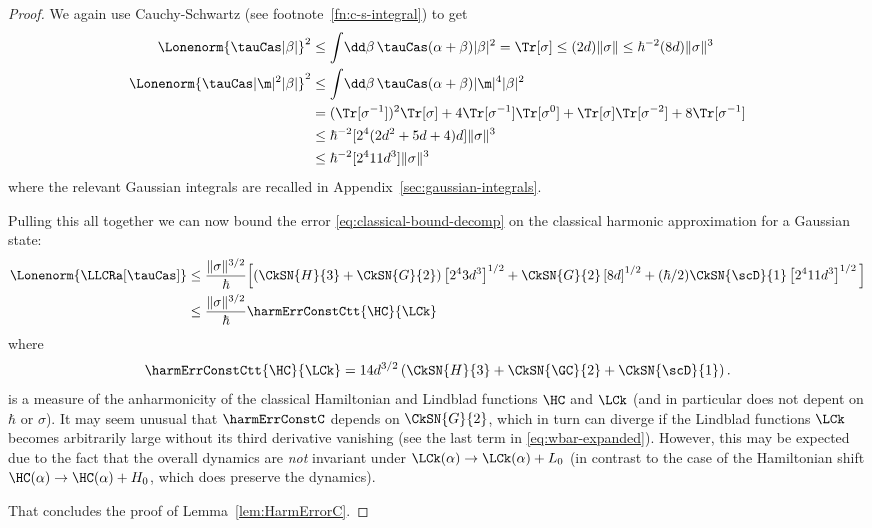 \documentclass{article}
\numberwithin{equation}{section}
\begin{document}
\begin{proof}
We again use Cauchy-Schwartz (see footnote~\ref{fn:c-s-integral}) to get
\begin{align}\begin{split}
		\label{eq:gaussian-int-m2-b1}
		\Lonenorm{\tauCas |\beta| }^2
		&\le \int \!\dd \beta\, \tauCas(\alpha+\beta)  |\beta|^2
		=  \Tr[\sigma ]
		\le  (2d) \|\sigma\| \le \hbar^{-2}(8d) \|\sigma\|^3
		\\
		\Lonenorm{\tauCas |\m|^2 |\beta| }^2
		&\le \int \!\dd \beta\, \tauCas(\alpha+\beta)  |\m|^4 |\beta|^2\\
		&=  (\Tr [\sigma^{-1}])^2\Tr[\sigma]+4\Tr[\sigma^{-1}]\Tr[\sigma^0]+ \Tr[\sigma] \Tr[\sigma^{-2}] + 8\Tr[\sigma^{-1}]\\
		&\le  \hbar^{-2} [2^4(2d^2+5d+4)d]\|\sigma\|^3\\
            &\le  \hbar^{-2} [2^4 11 d^3]\|\sigma\|^3
\end{split}\end{align}
where the relevant Gaussian integrals are recalled in Appendix~\ref{sec:gaussian-integrals}.


Pulling this all together we can now bound the error \eqref{eq:classical-bound-decomp} on the classical harmonic approximation for a Gaussian state:
\begin{align}\begin{split}\label{classical-error-bound}
		\Lonenorm{\LLCRa [\tauCas]}
            &\le \frac{\|\sigma\|^{3/2}}{\hbar}\Big[ (\CkSN{H}{3} + \CkSN{G}{2})  \left[2^4 3 d^3\right]^{1/2} + \CkSN{G}{2}  \left[8d\right]^{1/2} + (\hbar/2)\CkSN{\scD}{1}  \left[2^4 11 d^3\right]^{1/2} \Big] \\
		&\le \frac{\|\sigma\|^{3/2}}{\hbar} \harmErrConstCtt{\HC}{\LCk}
\end{split}\end{align}
where 
\begin{align} \label{eq:harmErrConstC-repeat}
	\harmErrConstCtt{\HC}{\LCk} = 14 d^{3/2}\left(\CkSN{H}{3} +  
     \CkSN{\GC}{2}  
     + 
     \CkSN{\scD}{1} 
     \right).
\end{align}
is a measure of the anharmonicity of the classical Hamiltonian and Lindblad functions $\HC$ and $\LCk$ (and in particular does not depent on $\hbar$ or $\sigma$).
It may seem unusual that $\harmErrConstC$ depends on $\CkSN{G}{2}$, which in turn can diverge if the Lindblad functions $\LCk$ becomes arbitrarily large without its third derivative vanishing (see the last term in \eqref{eq:wbar-expanded}). However, this may be expected due to the fact that the overall dynamics are \emph{not} invariant under $\LCk(\alpha) \to \LCk(\alpha) + L_0$ (in contrast to the case of the Hamiltonian shift $\HC(\alpha) \to \HC(\alpha) + H_0$, which does preserve the dynamics).

That concludes the proof of Lemma~\ref{lem:HarmErrorC}.
\end{proof}
\end{document}
